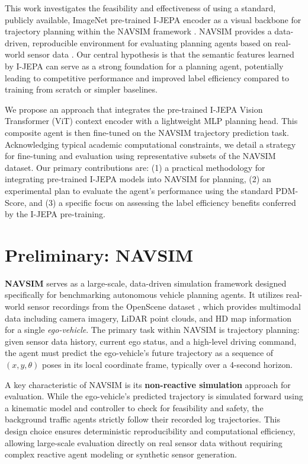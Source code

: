 \documentclass{article}
\begin{document}
This work investigates the feasibility and effectiveness of using a standard, publicly available, ImageNet pre-trained I-JEPA encoder as a visual backbone for trajectory planning within the NAVSIM framework \cite{dauner2024navsim}. NAVSIM provides a data-driven, reproducible environment for evaluating planning agents based on real-world sensor data \cite{OpenScene2023}. Our central hypothesis is that the semantic features learned by I-JEPA can serve as a strong foundation for a planning agent, potentially leading to competitive performance and improved label efficiency compared to training from scratch or simpler baselines.

We propose an approach that integrates the pre-trained I-JEPA Vision Transformer (ViT) context encoder with a lightweight MLP planning head. This composite agent is then fine-tuned on the NAVSIM trajectory prediction task. Acknowledging typical academic computational constraints, we detail a strategy for fine-tuning and evaluation using representative subsets of the NAVSIM dataset. Our primary contributions are: (1) a practical methodology for integrating pre-trained I-JEPA models into NAVSIM for planning, (2) an experimental plan to evaluate the agent's performance using the standard PDM-Score, and (3) a specific focus on assessing the label efficiency benefits conferred by the I-JEPA pre-training.

\section{Preliminary: NAVSIM}
\label{sec:navsim}
\textbf{NAVSIM} \cite{dauner2024navsim} serves as a large-scale, data-driven simulation framework designed specifically for benchmarking autonomous vehicle planning agents. It utilizes real-world sensor recordings from the OpenScene dataset \cite{OpenScene2023}, which provides multimodal data including camera imagery, LiDAR point clouds, and HD map information for a single \emph{ego-vehicle}. The primary task within NAVSIM is trajectory planning: given sensor data history, current ego status, and a high-level driving command, the agent must predict the ego-vehicle's future trajectory as a sequence of $(x, y, \theta)$ poses in its local coordinate frame, typically over a 4-second horizon.

A key characteristic of NAVSIM is its \textbf{non-reactive simulation} approach for evaluation. While the ego-vehicle's predicted trajectory is simulated forward using a kinematic model and controller to check for feasibility and safety, the background traffic agents strictly follow their recorded log trajectories. This design choice ensures deterministic reproducibility and computational efficiency, allowing large-scale evaluation directly on real sensor data without requiring complex reactive agent modeling or synthetic sensor generation.
\end{document}

